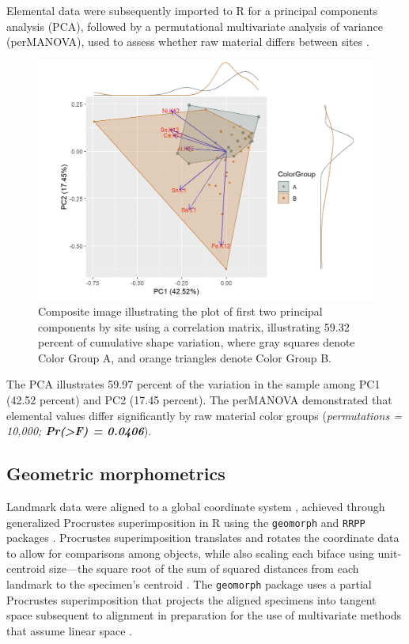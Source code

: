\documentclass[]{interact}
\theoremstyle{plain}%
\theoremstyle{definition}
\theoremstyle{remark}
\begin{document}
Elemental data were subsequently imported to R for a principal
components analysis (PCA), followed by a permutational multivariate
analysis of variance (perMANOVA), used to assess whether raw material
differs between sites \citep{R, vegan}.

\begin{figure}
\includegraphics[width=1\linewidth]{ms_files/figure-latex/pcaelem-1} \caption{Composite image illustrating the plot of first two principal components by site using a correlation matrix, illustrating 59.32 percent of cumulative shape variation, where gray squares denote Color Group A, and orange triangles denote Color Group B.}\label{fig:figsite}
\end{figure}

The PCA illustrates 59.97 percent of the variation in the sample among
PC1 (42.52 percent) and PC2 (17.45 percent). The perMANOVA demonstrated
that elemental values differ significantly by raw material color groups
(\emph{permutations = 10,000; \textbf{Pr(\textgreater F) = 0.0406}}).

\hypertarget{geometric-morphometrics}{%
\subsection{Geometric morphometrics}\label{geometric-morphometrics}}

Landmark data were aligned to a global coordinate system
\citep{RN8477, RN7502, RN11622, RN11623, RN11563}, achieved through
generalized Procrustes superimposition \citep{RN11138, RN478, RN1646} in
R using the \texttt{geomorph} and \texttt{RRPP} packages
\citep{RN1655, RN11775, RN11530, RN1774, RN9565}. Procrustes
superimposition translates and rotates the coordinate data to allow for
comparisons among objects, while also scaling each biface using
unit-centroid size---the square root of the sum of squared distances
from each landmark to the specimen's centroid
\citep{RN11139, RN11140, RN11564, RN478}. The \texttt{geomorph} package
uses a partial Procrustes superimposition that projects the aligned
specimens into tangent space subsequent to alignment in preparation for
the use of multivariate methods that assume linear space
\citep{RN11141, RN11142, RN1646, RN11563}.
\end{document}

